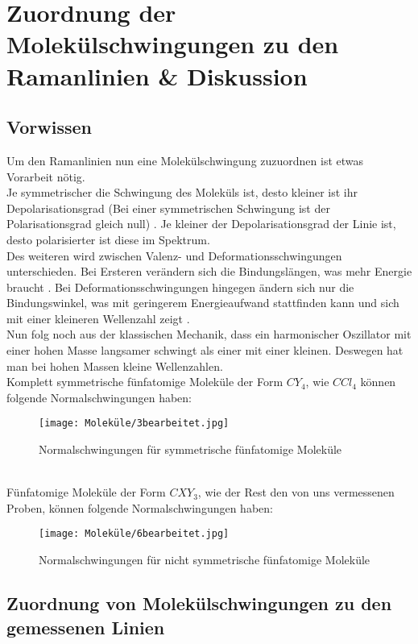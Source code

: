 \section{Zuordnung der Molekülschwingungen zu den Ramanlinien \& Diskussion}
\subsection{Vorwissen}
Um den Ramanlinien nun eine Molekülschwingung zuzuordnen ist etwas Vorarbeit nötig.\\
Je symmetrischer die Schwingung des Moleküls ist, desto kleiner ist ihr Depolarisationsgrad (Bei einer symmetrischen Schwingung ist der Polarisationsgrad gleich null) \citep[vgl.][]{Polgrad1}.
Je kleiner der Depolarisationsgrad der Linie ist, desto polarisierter ist diese im Spektrum.\\
Des weiteren wird zwischen Valenz- und Deformationsschwingungen unterschieden.
Bei Ersteren verändern sich die Bindungslängen, was mehr Energie braucht \citep[vgl.][]{Valenz}.
Bei Deformationsschwingungen hingegen ändern sich nur die Bindungswinkel, was mit geringerem Energieaufwand stattfinden kann und sich mit einer kleineren Wellenzahl zeigt \citep[vgl.][]{Deformation}.\\
Nun folg noch aus der klassischen Mechanik, dass ein harmonischer Oszillator mit einer hohen Masse langsamer schwingt als einer mit einer kleinen.
Deswegen hat man bei hohen Massen kleine Wellenzahlen.\\

Komplett symmetrische fünfatomige Moleküle der Form $CY_4$, wie $CCl_4$ können folgende Normalschwingungen haben:
\begin{figure}[h]
    \centering\texttt{[image: Moleküle/3bearbeitet.jpg]}
    \caption{Normalschwingungen für symmetrische fünfatomige Moleküle}
\end{figure}\\
Fünfatomige Moleküle der Form $CXY_3$, wie der Rest den von uns vermessenen Proben, können folgende Normalschwingungen haben:
\begin{figure}[h]
    \centering\texttt{[image: Moleküle/6bearbeitet.jpg]}
    \caption{Normalschwingungen für nicht symmetrische fünfatomige Moleküle}
\end{figure}\newpage
\subsection{Zuordnung von Molekülschwingungen zu den gemessenen Linien}
